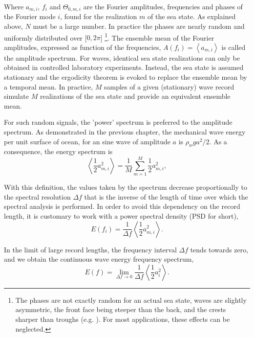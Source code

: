 Where $a_{m,i}$, $f_i$ and $\Theta_{0,m,i}$ are the Fourier amplitudes, frequencies and phases of 
the Fourier mode $i$, found for the realization $m$ of the sea state. As explained above, 
$N$ must be a large number. In practice the phases are nearly random and uniformly 
distributed over [$0,2\pi$] \footnote{The phases are not exactly random for an actual sea state, waves are 
slightly asymmetric, the front face being steeper than the back, and the crests sharper 
than troughs (e.g. \cite{Agnon&al.2005}). For most applications, these effects can be neglected.}. 
The ensemble mean of the Fourier amplitudes, expressed as function of the frequencies, 
 $A(f_i)= \left\langle a_{m,i}\right\rangle$ is called the amplitude spectrum.  For waves, 
identical sea state realizations can only be obtained in controlled laboratory experiments. 
Instead, the sea state is assumed stationary and the ergodicity theorem is evoked to replace the 
ensemble mean by a temporal mean. In practice, $M$ samples of a given (stationary) wave record simulate $M$ 
realizations of the sea state and provide an equivalent ensemble mean. 

For such random signals, the 'power' spectrum is preferred to the amplitude spectrum. 
As demonstrated in the previous chapter, the mechanical wave energy per unit surface of ocean, 
for an sine wave of amplitude $a$ is $\rho_w g a^2/2$. As a consequence, the energy spectrum is
\begin{equation}
\left\langle\frac{1}{2}a_{m,i}^{2}\right\rangle =\frac{1}{M}\sum_{m=1}^{M}\frac{1}{2}a_{m,i}^{2},
\label{eq3.2}
\end{equation}

With this definition, the values taken by the spectrum decrease proportionally to the spectral resolution $\Delta f$ that is the inverse of the length of time 
over which the spectral analysis is performed.  In order to avoid this dependency on the record length, it is customary to work with a power spectral density (PSD for short),
\begin{equation}
E(f_i)=\frac{1}{\Delta f} \left\langle \frac{1}{2} a_{m,i}^{2}\right\rangle. 
\label{eq3.3}
\end{equation}

In the limit of large record lengths, the frequency interval $\Delta f$ tends towards zero, and we obtain the continuous
wave energy frequency spectrum,
\begin{equation}
E(f)=\lim_{\Delta f\to 0}\frac{1}{\Delta f} \left\langle \frac{1}{2} a_{i}^{2}\right\rangle.
\label{eq3.4}
\end{equation}
 
